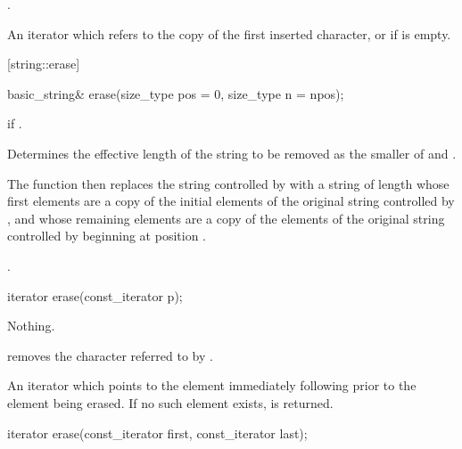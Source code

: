 \begin{itemdescr}
\pnum
\effects {}.

\pnum
\returns An iterator which refers to the copy of the first inserted character, or
 if  is empty.
\end{itemdescr}

[string::erase]{}

%
%
\begin{itemdecl}
basic_string& erase(size_type pos = 0, size_type n = npos);
\end{itemdecl}

\begin{itemdescr}
\pnum
\requires
{}

\pnum
\throws
{}
if 
.

\pnum
\effects
Determines the effective length 
of the string to be removed as the smaller of  and
.

\pnum
The function then replaces the string controlled by
with a string of length
whose first  elements are a copy of the initial elements of the original string controlled by
,
and whose remaining elements are a copy of the elements of the original string controlled by
beginning at position
.

\pnum
\returns
{}.
\end{itemdescr}

%
%
\begin{itemdecl}
iterator erase(const_iterator p);
\end{itemdecl}

\begin{itemdescr}
\pnum
\throws Nothing.

\pnum
\effects
removes the character referred to by .

\pnum
\returns
An iterator which points to the element immediately following  prior to
the element being erased.
If no such element exists,
is returned.
\end{itemdescr}

%
%
\begin{itemdecl}
iterator erase(const_iterator first, const_iterator last);
\end{itemdecl}

